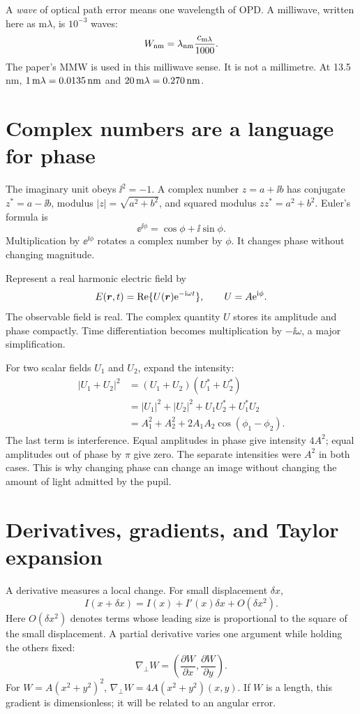 A \emph{wave} of optical path error means one wavelength of OPD.
A milliwave, written here as $\mathrm{m}\lambda$, is $10^{-3}$ waves:
\begin{equation}
W_{\rm nm}=\lambda_{\rm nm}\frac{c_{\mathrm{m}\lambda}}{1000}.
\label{eq:milliwave}
\end{equation}
The paper's MMW is used in this milliwave sense. It is not a millimetre.
At 13.5 nm, $1\,\mathrm{m}\lambda=0.0135\,\mathrm{nm}$ and
$20\,\mathrm{m}\lambda=0.270\,\mathrm{nm}$.

\section{Complex numbers are a language for phase}
The imaginary unit obeys $\ii^2=-1$. A complex number $z=a+\ii b$ has
conjugate $z^*=a-\ii b$, modulus $|z|=\sqrt{a^2+b^2}$, and squared modulus
$zz^*=a^2+b^2$. Euler's formula is
\begin{equation}
\ee^{\ii\phi}=\cos\phi+\ii\sin\phi.
\end{equation}
Multiplication by $\ee^{\ii\phi}$ rotates a complex number by $\phi$.
It changes phase without changing magnitude.

Represent a real harmonic electric field by
\begin{equation}
E(\bm{r},t)=\operatorname{Re}\{U(\bm{r})\mathrm{e}^{-\mathrm{i}\omega t}\},\qquad
U=A\mathrm{e}^{\mathrm{i}\phi}.
\label{eq:phasor}
\end{equation}
The observable field is real. The complex quantity $U$ stores its
amplitude and phase compactly. Time differentiation becomes multiplication
by $-\ii\omega$, a major simplification.

For two scalar fields $U_1$ and $U_2$, expand the intensity:
\begin{align}
|U_1+U_2|^2
&=(U_1+U_2)(U_1^*+U_2^*)\\
&=|U_1|^2+|U_2|^2+U_1U_2^*+U_1^*U_2\\
&=A_1^2+A_2^2+2A_1A_2\cos(\phi_1-\phi_2).
\label{eq:interference}
\end{align}
The last term is interference. Equal amplitudes in phase give intensity
$4A^2$; equal amplitudes out of phase by $\pi$ give zero. The separate
intensities were $A^2$ in both cases. This is why changing phase can
change an image without changing the amount of light admitted by the pupil.

\section{Derivatives, gradients, and Taylor expansion}
A derivative measures a local change. For small displacement $\delta x$,
\[
I(x+\delta x)=I(x)+I'(x)\delta x+O(\delta x^2).
\]
Here $O(\delta x^2)$ denotes terms whose leading size is proportional
to the square of the small displacement. A partial derivative varies
one argument while holding the others fixed:
\[
\nabla_\perp W=\left(\frac{\partial W}{\partial x},
\frac{\partial W}{\partial y}\right).
\]
For $W=A(x^2+y^2)^2$,
$\nabla_\perp W=4A(x^2+y^2)(x,y)$.
If $W$ is a length, this gradient is dimensionless; it will be related
to an angular error.

